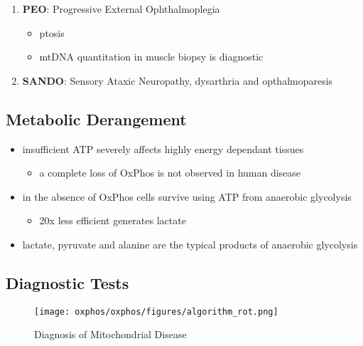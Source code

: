 \documentclass{scrartcl}
\begin{document}
\begin{enumerate}
\begin{enumerate}
\item \textbf{PEO}: Progressive External Ophthalmoplegia
\label{sec:org1fa8e80}
\begin{itemize}
\item ptosis
\item mtDNA quantitation in muscle biopsy is diagnostic
\end{itemize}

\item \textbf{SANDO}: Sensory Ataxic Neuropathy, dysarthria and opthalmoparesis
\label{sec:org3da6cd4}
\end{enumerate}
\end{enumerate}

\subsection{Metabolic Derangement}
\label{sec:org3a04ad3}
\begin{itemize}
\item insufficient ATP severely affects highly energy dependant tissues
\begin{itemize}
\item a complete loss of OxPhos is not observed in human disease
\end{itemize}
\item in the absence of OxPhos cells survive using ATP from anaerobic glycolysis
\begin{itemize}
\item 20x less efficient generates lactate
\end{itemize}
\item lactate, pyruvate and alanine are the typical products of anaerobic glycolysis
\end{itemize}

\subsection{Diagnostic Tests}
\label{sec:org9ed1146}
\begin{figure}[htbp]
\centering
\texttt{[image: oxphos/oxphos/figures/algorithm\_rot.png]}
\caption{\label{fig:org6ef595a}Diagnosis of Mitochondrial Disease}
\end{figure}
\end{document}
